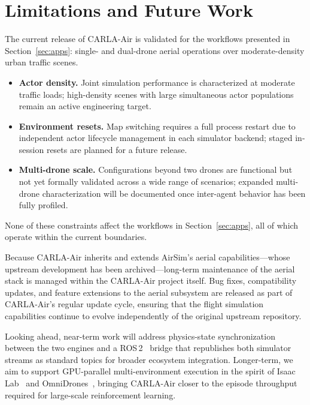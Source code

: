 
\section{Limitations and Future Work}
\label{sec:limitations}

The current release of CARLA-Air is validated for the workflows presented in
Section~\ref{sec:apps}: single- and dual-drone aerial operations over
moderate-density urban traffic scenes.

\begin{itemize}[leftmargin=*]
  \item \textbf{Actor density.}
  Joint simulation performance is characterized at moderate traffic loads;
  high-density scenes with large simultaneous actor populations remain an
  active engineering target.

  \item \textbf{Environment resets.}
  Map switching requires a full process restart due to independent actor
  lifecycle management in each simulator backend; staged in-session resets are
  planned for a future release.

  \item \textbf{Multi-drone scale.}
  Configurations beyond two drones are functional but not yet formally
  validated across a wide range of scenarios; expanded multi-drone
  characterization will be documented once inter-agent behavior has been fully
  profiled.
\end{itemize}

\noindent None of these constraints affect the workflows in
Section~\ref{sec:apps}, all of which operate within the current boundaries.

Because CARLA-Air inherits and extends AirSim's aerial
capabilities---whose upstream development has been archived---long-term
maintenance of the aerial stack is managed within the CARLA-Air project
itself. Bug fixes, compatibility updates, and feature extensions to the aerial
subsystem are released as part of CARLA-Air's regular update cycle, ensuring
that the flight simulation capabilities continue to evolve independently of
the original upstream repository.

Looking ahead, near-term work will address physics-state synchronization
between the two engines and a ROS\,2~\cite{ros2} bridge that republishes both
simulator streams as standard topics for broader ecosystem integration.
Longer-term, we aim to support GPU-parallel multi-environment execution in the
spirit of Isaac Lab~\cite{isaaclab} and OmniDrones~\cite{omnidrones}, bringing
CARLA-Air closer to the episode throughput required for large-scale
reinforcement learning.


